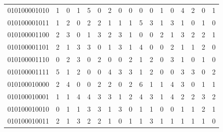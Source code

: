 \documentclass[10pt,a4paper]{article}
\begin{document}
\begin{longtable}{ |c|c|c|c|c|c|c|c|c|c|c|c|c|c|c|c|c| }
    010100001010              & 1                            & 0                                & 1                            & 5                              & 0   & 2   & 0   & 0   & 0   & 0   & 1   & 0   & 4   & 2   & 0   & 1   \\
    010100001011              & 1                            & 2                                & 0                            & 2                              & 2   & 1   & 1   & 1   & 5   & 3   & 1   & 3   & 1   & 0   & 1   & 0   \\
    010100001100              & 2                            & 3                                & 0                            & 1                              & 3   & 2   & 3   & 1   & 0   & 0   & 2   & 1   & 3   & 2   & 2   & 1   \\
    010100001101              & 2                            & 1                                & 3                            & 3                              & 0   & 1   & 3   & 1   & 4   & 0   & 0   & 2   & 1   & 1   & 2   & 0   \\
    010100001110              & 0                            & 2                                & 3                            & 0                              & 2   & 0   & 0   & 2   & 1   & 2   & 0   & 3   & 1   & 0   & 1   & 0   \\
    010100001111              & 5                            & 1                                & 2                            & 0                              & 0   & 4   & 3   & 3   & 1   & 2   & 0   & 0   & 3   & 3   & 0   & 2   \\
    010100010000              & 2                            & 4                                & 0                            & 0                              & 2   & 2   & 0   & 2   & 6   & 1   & 1   & 4   & 3   & 0   & 1   & 1   \\
    010100010001              & 1                            & 1                                & 4                            & 4                              & 3   & 3   & 1   & 2   & 4   & 3   & 1   & 4   & 2   & 2   & 3   & 2   \\
    010100010010              & 0                            & 1                                & 1                            & 3                              & 3   & 1   & 3   & 0   & 1   & 1   & 0   & 0   & 1   & 1   & 2   & 1   \\
    010100010011              & 2                            & 1                                & 3                            & 2                              & 2   & 1   & 0   & 1   & 1   & 3   & 1   & 1   & 1   & 1   & 1   & 0   \\

\end{longtable}
\end{document}
